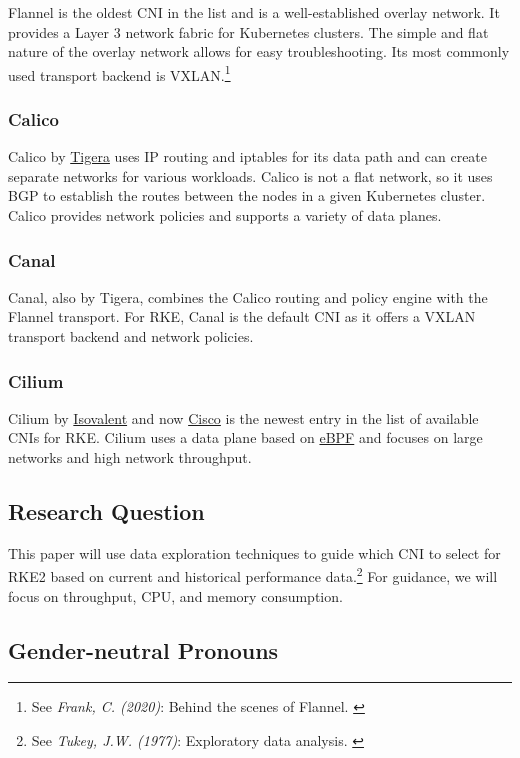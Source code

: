 Flannel is the oldest CNI in the list and is a well-established overlay network. It provides a Layer 3 network fabric for Kubernetes clusters. The simple and flat nature of the overlay network allows for easy troubleshooting. Its most commonly used transport backend is VXLAN.\footnote{See \textit{Frank, C. (2020)}: Behind the scenes of Flannel. \cite{flannel}}

\subsubsection{Calico}

Calico by \href{https://www.tigera.io/}{Tigera} uses IP routing and iptables for its data path and can create separate networks for various workloads. Calico is not a flat network, so it uses BGP to establish the routes between the nodes in a given Kubernetes cluster. Calico provides network policies and supports a variety of data planes.

\subsubsection{Canal}

Canal, also by Tigera, combines the Calico routing and policy engine with the Flannel transport. For RKE, Canal is the default CNI as it offers a VXLAN transport backend and network policies.

\subsubsection{Cilium}

Cilium by \href{https://isovalent.com/}{Isovalent} and now \href{https://www.cisco.com/}{Cisco} is the newest entry in the list of available CNIs for RKE. Cilium uses a data plane based on \href{https://ebpf.io/}{eBPF} and focuses on large networks and high network throughput.

\subsection{Research Question}

This paper will use data exploration techniques to guide which CNI to select for RKE2 based on current and historical performance data.\footnote{See \textit{Tukey, J.W. (1977)}: Exploratory data analysis. \cite{exploratoryDA}} For guidance, we will focus on throughput, CPU, and memory consumption.

\subsection{Gender-neutral Pronouns}

